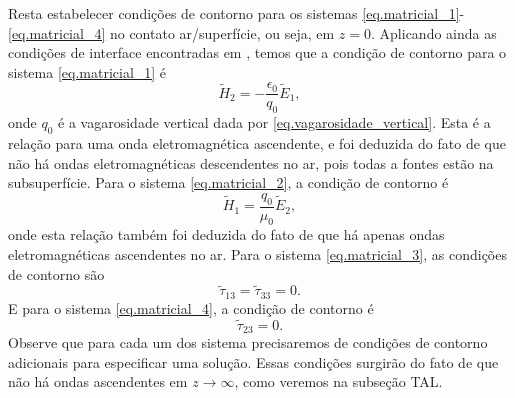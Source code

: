 Resta estabelecer condi\c{c}\~oes de contorno para os sistemas \ref{eq.matricial_1}-\ref{eq.matricial_4} no contato ar/superf\'icie, ou seja, em $z=0$. Aplicando ainda as condi\c{c}\~oes de interface encontradas em \cite{pride_94}, temos que a condi\c{c}\~ao de contorno para o sistema \ref{eq.matricial_1} \'e
\begin{equation}
\tilde{H}_2=-\frac{\epsilon_0}{q_0}\tilde{E}_1,
\end{equation}
onde $q_0$ \'e a vagarosidade vertical dada por \ref{eq.vagarosidade_vertical}. Esta \'e a rela\c{c}\~ao para uma onda eletromagn\'etica ascendente, e foi deduzida do fato de que n\~ao h\'a ondas eletromagn\'eticas descendentes no ar, pois todas a fontes est\~ao na subsuperf\'icie.
Para o sistema \ref{eq.matricial_2}, a condi\c{c}\~ao de contorno \'e
\begin{equation}
\tilde{H}_1=\frac{q_0}{\mu_0}\tilde{E}_2,
\end{equation}
onde esta rela\c{c}\~ao tamb\'em foi deduzida do fato de que h\'a apenas ondas eletromagn\'eticas ascendentes no ar.
Para o sistema \ref{eq.matricial_3}, as condi\c{c}\~oes de contorno s\~ao
\begin{equation}
\tilde{\tau}_{13}=\tilde{\tau}_{33}=0.
\end{equation}
E para o sistema \ref{eq.matricial_4}, a condi\c{c}\~ao de contorno \'e
\begin{equation}
\tilde{\tau}_{23}=0.
\end{equation}
Observe que para cada um dos sistema precisaremos de condi\c{c}\~oes de contorno adicionais para especificar uma solu\c{c}\~ao. Essas condi\c{c}\~oes surgir\~ao do fato de que n\~ao h\'a ondas ascendentes em $z\rightarrow\infty$, como veremos na subse\c{c}\~ao TAL.

